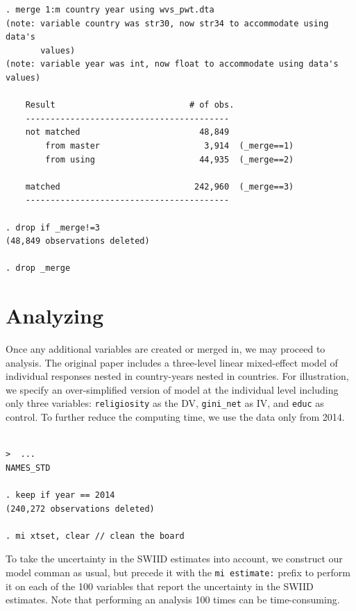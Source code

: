\documentclass[11pt,]{article}
\theoremstyle{definition}
\theoremstyle{definition}
\theoremstyle{remark}
\begin{document}
\begin{verbatim}
. merge 1:m country year using wvs_pwt.dta
(note: variable country was str30, now str34 to accommodate using data's
       values)
(note: variable year was int, now float to accommodate using data's values)

    Result                           # of obs.
    -----------------------------------------
    not matched                        48,849
        from master                     3,914  (_merge==1)
        from using                     44,935  (_merge==2)

    matched                           242,960  (_merge==3)
    -----------------------------------------

. drop if _merge!=3
(48,849 observations deleted)

. drop _merge
\end{verbatim}

\section{Analyzing}\label{analyzing}

Once any additional variables are created or merged in, we may proceed
to analysis. The original paper includes a three-level linear
mixed-effect model of individual responses nested in country-years
nested in countries. For illustration, we specify an over-simplified
version of model at the individual level including only three variables:
\texttt{religiosity} as the DV, \texttt{gini\_net} as IV, and
\texttt{educ} as control. To further reduce the computing time, we use
the data only from 2014.

\begin{verbatim}

>  ...
NAMES_STD

. keep if year == 2014
(240,272 observations deleted)

. mi xtset, clear // clean the board
\end{verbatim}

To take the uncertainty in the SWIID estimates into account, we
construct our model comman as usual, but precede it with the
\texttt{mi\ estimate:} prefix to perform it on each of the 100 variables
that report the uncertainty in the SWIID estimates. Note that performing
an analysis 100 times can be time-consuming.
\end{document}
